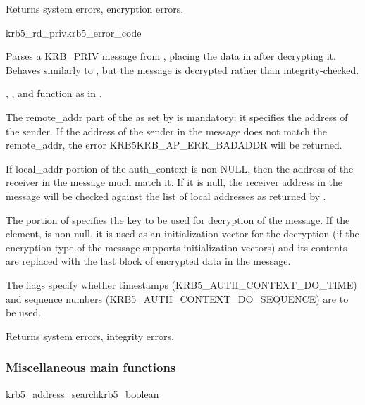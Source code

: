 Returns system errors, encryption errors.

\begin{funcdecl}{krb5_rd_priv}{krb5_error_code}{\funcinout}
\funcin
{}
\funcout
{}
\end{funcdecl}

Parses a KRB_PRIV message from , placing the data in
 after decrypting it.  Behaves similarly to
, but the message is decrypted rather than
integrity-checked.

, , 
 and 
function as in .


The remote_addr part of the  as set by
 is mandatory;  it
specifies the address of the sender.  If the address of the sender in
the message does not match the remote_addr, the error
KRB5KRB_AP_ERR_BADADDR will be returned.

If local_addr portion of the auth_context is non-NULL, then the address
of the receiver in the message much match it.  If it is null, the
receiver address in the message will be checked against the list of
local addresses as returned by .

The  portion of  specifies
the key to be used for decryption of the message.  If the
 element, is non-null, it is used as an
initialization vector for the decryption (if the encryption type of the
message supports initialization vectors) and its contents are replaced
with the last block of encrypted data in the message.

The  flags specify whether timestamps
(KRB5_AUTH_CONTEXT_DO_TIME) and sequence numbers
(KRB5_AUTH_CONTEXT_DO_SEQUENCE) are to be used.

Returns system errors, integrity errors.

\subsubsection{Miscellaneous main functions}

\begin{funcdecl}{krb5_address_search}{krb5_boolean}{\funcinout}
\funcin
{}
\end{funcdecl}

